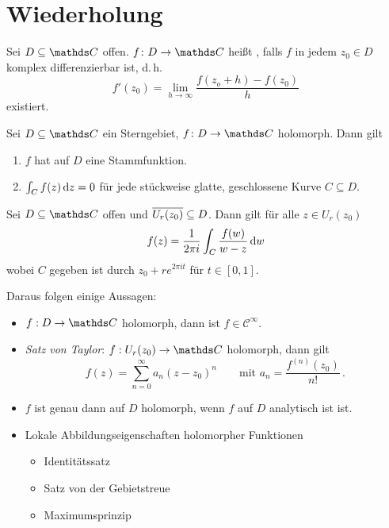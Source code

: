 
\setcounter{chapter}{-1}
\chapter{Wiederholung}

\begin{defi}
Sei $D \subseteq \CC$ offen. $f\colon D \ra \CC$ heißt , falls $f$ in jedem $z_0 \in D$ komplex differenzierbar ist, d.\,h.
\[
	f'(z_0) = \lim_{h \to \infty} \frac{f(z_o + h)-f(z_0)}{h}
\]
existiert.
\end{defi}

\begin{satz}
Sei $D\subseteq\CC$ ein Sterngebiet, $f\colon D \ra \CC$ holomorph.
Dann gilt
\begin{enumerate}
\item $f$ hat auf $D$ eine Stammfunktion.
\item $\int _ C f(z) \,\mathrm{d} z = 0$ für jede stückweise glatte, geschlossene Kurve $C \subseteq D$.
\end{enumerate}
\end{satz}

\begin{satz}
Sei $D\subseteq\CC$ offen und $\overline{U_r(z_0)} \subseteq D$. Dann gilt für alle $z\in U_r(z_0)$
\[
	f(z) = \frac{1}{2\pi i} \int _ C \frac{f(w)}{w-z}\,\mathrm{d} w
\]
wobei $C$ gegeben ist durch $z_0 + re^{2\pi it}$ für $t\in[0,1]$.
\end{satz}

Daraus folgen einige Aussagen:
\begin{itemize}
\item $f:D \ra \CC$ holomorph, dann ist $f \in \mathcal{C}^\infty$.
\item \emph{Satz von Taylor}: $f:U_r(z_0) \ra \CC$ holomorph, dann gilt
\[
	f(z) = \sum _{n=0}^\infty a_n(z-z_0)^n \qquad \text{mit } a_n = \frac{f^{(n)}(z_0)}{n!}\,.
\]
\item $f$ ist genau dann auf $D$ holomorph, wenn $f$ auf $D$ analytisch ist ist.
\item Lokale Abbildungseigenschaften holomorpher Funktionen
\begin{itemize}
\item Identitätssatz
\item Satz von der Gebietstreue
\item Maximumsprinzip
\end{itemize}
\end{itemize}

